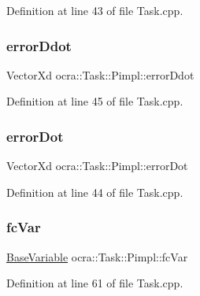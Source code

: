Definition at line 43 of file Task.\+cpp.

\hypertarget{structocra_1_1Task_1_1Pimpl_aba21dcd508621e5fbfc9d53f5f38a6d6}{}\label{structocra_1_1Task_1_1Pimpl_aba21dcd508621e5fbfc9d53f5f38a6d6} 
\subsubsection{\texorpdfstring{error\+Ddot}{errorDdot}}
{\footnotesize\ttfamily Vector\+Xd ocra\+::\+Task\+::\+Pimpl\+::error\+Ddot}



Definition at line 45 of file Task.\+cpp.

\hypertarget{structocra_1_1Task_1_1Pimpl_a58b49c44912e1f4f00c5c804530f6727}{}\label{structocra_1_1Task_1_1Pimpl_a58b49c44912e1f4f00c5c804530f6727} 
\subsubsection{\texorpdfstring{error\+Dot}{errorDot}}
{\footnotesize\ttfamily Vector\+Xd ocra\+::\+Task\+::\+Pimpl\+::error\+Dot}



Definition at line 44 of file Task.\+cpp.

\hypertarget{structocra_1_1Task_1_1Pimpl_ae95e699c5e631e1ec4e6d887b800f322}{}\label{structocra_1_1Task_1_1Pimpl_ae95e699c5e631e1ec4e6d887b800f322} 
\subsubsection{\texorpdfstring{fc\+Var}{fcVar}}
{\footnotesize\ttfamily \hyperlink{classocra_1_1BaseVariable}{Base\+Variable} ocra\+::\+Task\+::\+Pimpl\+::fc\+Var}



Definition at line 61 of file Task.\+cpp.

\hypertarget{structocra_1_1Task_1_1Pimpl_a3f7bda3b477717e114b50b8ec9830455}{}\label{structocra_1_1Task_1_1Pimpl_a3f7bda3b477717e114b50b8ec9830455} 
